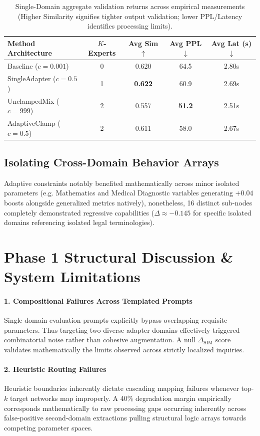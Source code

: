 \documentclass[11pt]{article}
\begin{document}
\begin{table}[H]
\centering
\begin{tabular}{lcccc}
\toprule
\textbf{Method Architecture} & \textbf{$K$-Experts} & \textbf{Avg Sim $\uparrow$} & \textbf{Avg PPL $\downarrow$} & \textbf{Avg Lat (s) $\downarrow$} \\
\midrule
Baseline ($c=0.001$) & 0 & 0.620 & 64.5 & 2.80s \\
SingleAdapter ($c=0.5$) & 1 & \textbf{0.622} & 60.9 & 2.69s \\
UnclampedMix ($c=999$) & 2 & 0.557 & \textbf{51.2} & 2.51s \\
AdaptiveClamp ($c=0.5$) & 2 & 0.611 & 58.0 & 2.67s \\
\bottomrule
\end{tabular}
\caption{Single-Domain aggregate validation returns across empirical measurements (Higher Similarity signifies tighter output validation; lower PPL/Latency identifies processing limits).}
\end{table}

\subsection{Isolating Cross-Domain Behavior Arrays}
Adaptive constraints notably benefited mathematically across minor isolated parameters (e.g. Mathematics and Medical Diagnostic variables generating $+0.04$ boosts alongside generalized metrics natively), nonetheless, 16 distinct sub-nodes completely demonstrated regressive capabilities ($\Delta \approx -0.145$ for specific isolated domains referencing isolated legal terminologies). 

\section{Phase 1 Structural Discussion \& System Limitations}

\paragraph{1. Compositional Failures Across Templated Prompts}
Single-domain evaluation prompts explicitly bypass overlapping requisite parameters. Thus targeting two diverse adapter domains effectively triggered combinatorial noise rather than cohesive augmentation. A null $\Delta_{\text{SIM}}$ score validates mathematically the limits observed across strictly localized inquiries.

\paragraph{2. Heuristic Routing Failures}
Heuristic boundaries inherently dictate cascading mapping failures whenever top-$k$ target networks map improperly. A 40\% degradation margin empirically corresponds mathematically to raw processing gaps occurring inherently across false-positive second-domain extractions pulling structural logic arrays towards competing parameter spaces.
\end{document}

